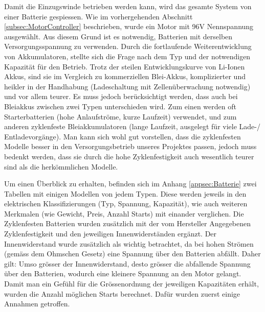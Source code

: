 Damit die Einzugswinde betrieben werden kann, wird das gesamte System von einer Batterie gespiessen. Wie im vorhergehenden Abschnitt \ref{subsec:MotorController} beschrieben, wurde ein Motor mit 96V Nennspannung ausgewählt. Aus diesem Grund ist es notwendig, Batterien mit derselben Versorgungsspannung zu verwenden. Durch die fortlaufende Weiterentwicklung von Akkumulatoren, stellte sich die Frage nach dem Typ und der notwendigen Kapazität für den Betrieb. Trotz der steilen Entwicklungskurve von Li-Ionen Akkus, sind sie im Vergleich zu kommerziellen Blei-Akkus, komplizierter und heikler in der Handhabung (Ladeschaltung mit Zellenüberwachung notwendig) und vor allem teurer. Es muss jedoch berücksichtigt werden, dass auch bei Bleiakkus zwischen zwei Typen unterschieden wird. Zum einen werden oft Starterbatterien (hohe Anlaufströme, kurze Laufzeit) verwendet, und zum anderen zyklenfeste Bleiakkumulatoren (lange Laufzeit, ausgelegt für viele Lade-/ Entladevorgänge). Man kann sich wohl gut vorstellen, dass die zyklenfesten Modelle besser in den Versorgungsbetrieb unseres Projektes passen, jedoch muss bedenkt werden, dass sie durch die hohe Zyklenfestigkeit auch wesentlich teurer sind als die herkömmlichen Modelle.

Um einen Überblick zu erhalten, befinden sich im Anhang \ref{appsec:Batterie} zwei Tabellen mit einigen Modellen von jedem Typen. Diese werden jeweils in den elektrischen Klassifizierungen (Typ, Spannung, Kapazität), wie auch weiteren Merkmalen (wie Gewicht, Preis, Anzahl Starts) mit einander verglichen. Die Zyklenfesten Batterien wurden zusätzlich mit der vom Hersteller Angegebenen Zyklenfestigkeit und den jeweiligen Innenwiderständen ergänzt. Der Innenwiderstand wurde zusätzlich als wichtig betrachtet, da bei hohen Strömen (gemäss dem Ohmschen Gesetz) eine Spannung über den Batterien abfällt. Daher gilt: Umso grösser der Innenwiderstand, desto grösser die abfallende Spannung über den Batterien, wodurch eine kleinere Spannung an den Motor gelangt.
Damit man ein Gefühl für die Grössenordnung der jeweiligen Kapazitäten erhält, wurden die Anzahl möglichen Starts berechnet. Dafür wurden zuerst einige Annahmen getroffen.

